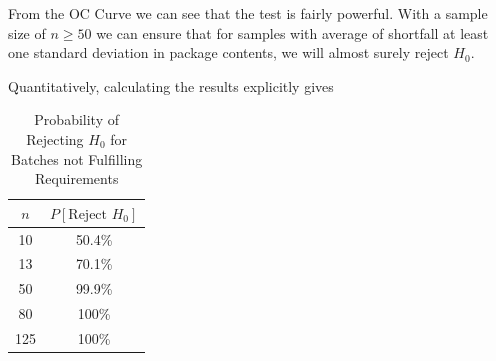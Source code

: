 \documentclass{article}
\begin{document}
From the OC Curve we can see that the test is fairly powerful. With a sample size of $n\geq50$ we can ensure that for samples with average of shortfall at least one standard deviation in package contents, we will almost surely reject $H_0$.

Quantitatively, calculating the results explicitly gives

\begin{table}[htbp]
    \centering
    \begin{tabular}{cc}
        \toprule
        $n$ & $P[\text{Reject }H_0]$  \\
        \midrule
        10 & 50.4\% \\
        13 & 70.1\% \\
        50 & 99.9\%  \\
        80 & 100\% \\ 
        125 & 100\% \\
        \bottomrule
    \end{tabular}
    \caption{Probability of Rejecting $H_0$ for Batches not Fulfilling Requirements}
\end{table}
\end{document}
